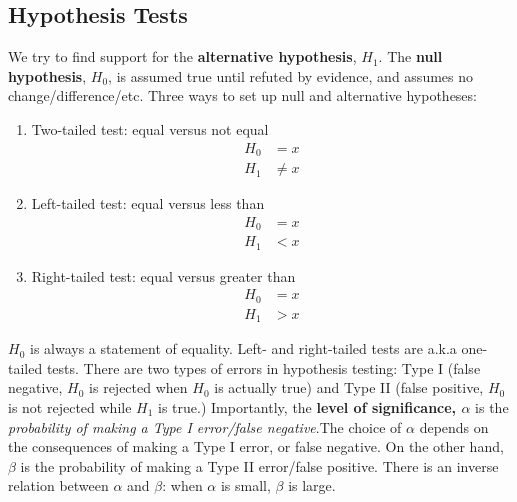 \documentclass[]{article}
\begin{document}
\subsection{Hypothesis Tests}
We try to find support for the \textbf{alternative hypothesis}, $H_1$. The \textbf{null hypothesis}, $H_0$, is assumed true until refuted by evidence, and assumes no change/difference/etc. Three ways to set up null and alternative hypotheses:
\begin{enumerate}
	\item Two-tailed test: equal versus not equal
	\begin{align*}
		H_0 &= x \\
		H_1 &\neq x
	\end{align*}
	
	\item Left-tailed test: equal versus less than 
	\begin{align*}
	H_0 &= x \\
	H_1 &< x
	\end{align*}
	
	\item Right-tailed test: equal versus greater than 
	\begin{align*}
	H_0 &= x \\
	H_1 &> x
	\end{align*}
\end{enumerate}

$H_0$ is always a statement of equality. Left- and right-tailed tests are a.k.a one-tailed tests. There are two types of errors in hypothesis testing: Type I (false negative, $H_0$ is rejected when $H_0$ is actually true) and Type II (false positive, $H_0$ is not rejected while $H_1$ is true.) Importantly, the \textbf{level of significance, $\alpha$} is the \textit{probability of making a Type I error/false negative}.The  choice of $\alpha$ depends on the consequences of making a Type I error, or false negative. On the other hand, $\beta$ is the probability of making a Type II error/false positive. There is an inverse relation between $\alpha$ and $\beta$: when $\alpha$ is small, $\beta$ is large. 
\end{document}
